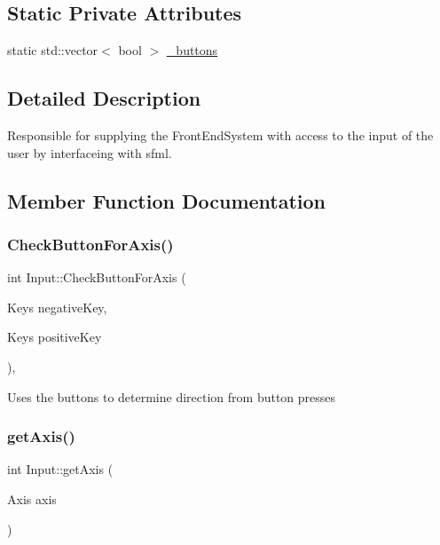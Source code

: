 \subsection*{Static Private Attributes}
\begin{DoxyCompactItemize}
\item 
static std\+::vector$<$ bool $>$ \hyperlink{class_input_affef708e1d603d97a7218b64eab063b5}{\+\_\+buttons}
\end{DoxyCompactItemize}


\subsection{Detailed Description}
Responsible for supplying the Front\+End\+System with access to the input of the user by interfaceing with sfml. 

\subsection{Member Function Documentation}
\mbox{\label{class_input_a7419956b2d6001cef104b8abdf242477}} 
\subsubsection{\texorpdfstring{Check\+Button\+For\+Axis()}{CheckButtonForAxis()}}
{\footnotesize\ttfamily int Input\+::\+Check\+Button\+For\+Axis (\begin{DoxyParamCaption}\item[{Keys}]{negative\+Key,  }\item[{Keys}]{positive\+Key }\end{DoxyParamCaption})\hspace{0.3cm}{\ttfamily [static]}, {\ttfamily [private]}}

Uses the buttons to determine direction from button presses \mbox{\label{class_input_a5c4b1c67c7d3e28d4af79601c81ed8bb}} 
\subsubsection{\texorpdfstring{get\+Axis()}{getAxis()}}
{\footnotesize\ttfamily int Input\+::get\+Axis (\begin{DoxyParamCaption}\item[{Axis}]{axis }\end{DoxyParamCaption})\hspace{0.3cm}{\ttfamily [static]}}



